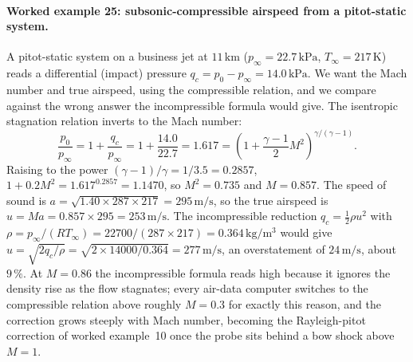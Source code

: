 \paragraph{Worked example 25: subsonic-compressible airspeed from a
pitot-static system.} A pitot-static system on a business jet at
$11\,\si{\kilo\meter}$ ($p_\infty = 22.7\,\text{kPa}$,
$T_\infty = 217\,\si{\kelvin}$) reads a differential (impact) pressure
$q_c = p_0 - p_\infty = 14.0\,\text{kPa}$. We want the Mach number and
true airspeed, using the compressible relation, and we compare against
the wrong answer the incompressible formula would give. The isentropic
stagnation relation inverts to the Mach number:
\[
\frac{p_0}{p_\infty} = 1 + \frac{q_c}{p_\infty} = 1 + \frac{14.0}{22.7}
= 1.617 = \left(1 + \frac{\gamma - 1}{2}M^2\right)^{\gamma/(\gamma -
1)}.
\]
Raising to the power $(\gamma - 1)/\gamma = 1/3.5 = 0.2857$,
$1 + 0.2 M^2 = 1.617^{0.2857} = 1.1470$, so $M^2 = 0.735$ and
$M = 0.857$. The speed of sound is $a = \sqrt{1.40\times 287\times 217}
= 295\,\si{\meter\per\second}$, so the true airspeed is
$u = M a = 0.857\times 295 = 253\,\si{\meter\per\second}$. The
incompressible reduction $q_c = \tfrac{1}{2}\rho u^2$ with
$\rho = p_\infty/(R T_\infty) = 22700/(287\times 217) =
0.364\,\si{\kilogram\per\meter\cubed}$ would give
$u = \sqrt{2 q_c/\rho} = \sqrt{2\times 14000/0.364} = 277\,\si{\meter
\per\second}$, an overstatement of $24\,\si{\meter\per\second}$, about
$9\,\%$. At $M = 0.86$ the incompressible formula reads high because it
ignores the density rise as the flow stagnates; every air-data computer
switches to the compressible relation above roughly $M = 0.3$ for
exactly this reason, and the correction grows steeply with Mach number,
becoming the Rayleigh-pitot correction of worked example~10 once the
probe sits behind a bow shock above $M = 1$.

